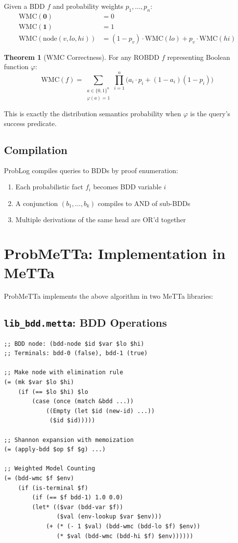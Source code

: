 \documentclass[11pt,a4paper]{article}
\theoremstyle{definition}
\newtheorem{theorem}{Theorem}[section]
\begin{document}
Given a BDD $f$ and probability weights $p_1, \ldots, p_n$:
\begin{align}
\mathrm{WMC}(\mathbf{0}) &= 0 \\
\mathrm{WMC}(\mathbf{1}) &= 1 \\
\mathrm{WMC}(\mathrm{node}(v, \mathit{lo}, \mathit{hi})) &= (1-p_v) \cdot \mathrm{WMC}(\mathit{lo}) + p_v \cdot \mathrm{WMC}(\mathit{hi})
\end{align}

\begin{theorem}[WMC Correctness]
For any ROBDD $f$ representing Boolean function $\varphi$:
\[
\mathrm{WMC}(f) = \sum_{\substack{a \in \{0,1\}^n \\ \varphi(a) = 1}} \prod_{i=1}^{n} \bigl(a_i \cdot p_i + (1-a_i)(1-p_i)\bigr)
\]
\end{theorem}

This is exactly the distribution semantics probability when $\varphi$ is
the query's success predicate.

\subsection{Compilation}

ProbLog compiles queries to BDDs by proof enumeration:
\begin{enumerate}
\item Each probabilistic fact $f_i$ becomes BDD variable $i$
\item A conjunction $(b_1, \ldots, b_k)$ compiles to $\mathrm{AND}$ of sub-BDDs
\item Multiple derivations of the same head are $\mathrm{OR}$'d together
\end{enumerate}

\section{ProbMeTTa: Implementation in MeTTa}

ProbMeTTa implements the above algorithm in two MeTTa libraries:

\subsection{\texttt{lib\_bdd.metta}: BDD Operations}

\begin{lstlisting}[language=MeTTa]
;; BDD node: (bdd-node $id $var $lo $hi)
;; Terminals: bdd-0 (false), bdd-1 (true)

;; Make node with elimination rule
(= (mk $var $lo $hi)
    (if (== $lo $hi) $lo
        (case (once (match &bdd ...))
            ((Empty (let $id (new-id) ...))
             ($id $id)))))

;; Shannon expansion with memoization
(= (apply-bdd $op $f $g) ...)

;; Weighted Model Counting
(= (bdd-wmc $f $env)
    (if (is-terminal $f)
        (if (== $f bdd-1) 1.0 0.0)
        (let* (($var (bdd-var $f))
               ($val (env-lookup $var $env)))
            (+ (* (- 1 $val) (bdd-wmc (bdd-lo $f) $env))
               (* $val (bdd-wmc (bdd-hi $f) $env))))))
\end{lstlisting}
\end{document}
